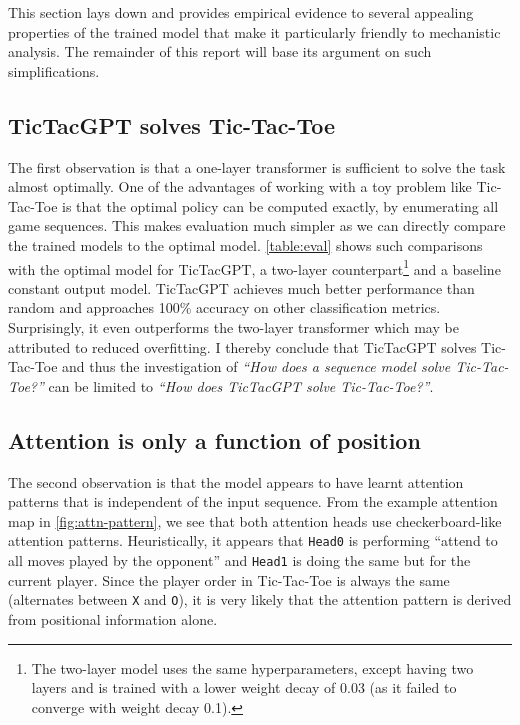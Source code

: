 \documentclass{article}
\newcommand{\ttgpt}{TicTacGPT\xspace}
\newcommand{\ttt}{Tic-Tac-Toe\xspace}
\newcounter{num}
\begin{document}


This section lays down and provides empirical evidence to several appealing properties of the trained model that make it particularly friendly to mechanistic analysis. The remainder of this report will base its argument on such simplifications.

\subsection{\ttgpt solves \ttt}

The first observation is that a one-layer transformer is sufficient to solve the task almost optimally. One of the advantages of working with a toy problem like \ttt is that the optimal policy can be computed exactly, by enumerating all game sequences. This makes evaluation much simpler as we can directly compare the trained models to the optimal model. \cref{table:eval} shows such comparisons with the optimal model for \ttgpt, a two-layer counterpart\footnote{The two-layer model uses the same hyperparameters, except having two layers and is trained with a lower weight decay of 0.03 (as it failed to converge with weight decay 0.1).} and a baseline constant output model. \ttgpt achieves much better performance than random and approaches 100\% accuracy on other classification metrics. Surprisingly, it even outperforms the two-layer transformer which may be attributed to reduced overfitting. I thereby conclude that \ttgpt solves \ttt and thus the investigation of \emph{``How does a sequence model solve \ttt?''} can be limited to \emph{``How does \ttgpt solve \ttt?''}.

\subsection{Attention is only a function of position} \label{sec:simplify-attn}



The second observation is that the model appears to have learnt attention patterns that is independent of the input sequence. From the example attention map in \cref{fig:attn-pattern}, we see that both attention heads use checkerboard-like attention patterns. Heuristically, it appears that \texttt{Head0} is performing ``attend to all moves played by the opponent'' and \texttt{Head1} is doing the same but for the current player. Since the player order in \ttt is always the same (alternates between \texttt{X} and \texttt{O}), it is very likely that the attention pattern is derived from positional information alone.
\end{document}
